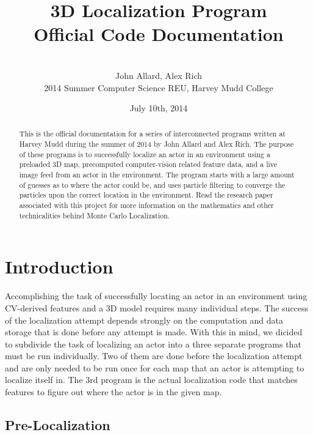 \documentclass[a4paper,11pt]{article}
\title{3D Localization Program \\ Official Code Documentation}
\author{ \\[7in]  John Allard, Alex Rich \\ 2014 Summer Computer Science REU, Harvey Mudd College}
\date{July 10th, 2014}
\begin{document}
  \maketitle
  \newpage

    \tableofcontents
    \newpage

    \begin{abstract}
    This is the official documentation for a series of interconnected programs written at Harvey Mudd during the summer of 2014 by John Allard and Alex Rich. The purpose of these programs is to successfully localize an actor in an environment using a preloaded 3D map, precomputed computer-vision related feature data, and a live image feed from an actor in the environment. The program starts with a large amount of guesses as to where the actor could be, and uses particle filtering to converge the particles upon the correct location in the environment. Read the research paper associated with this project for more information on the mathematics and other technicalities behind Monte Carlo Localization.
    \end{abstract}

    \section{Introduction}
    Accomplishing the task of successfully locating an actor in an environment using CV-derived features and a 3D model requires many individual steps. The success of the localization attempt depends strongly on the computation and data storage that is done before any attempt is made. With this in mind, we dicided to subdivide the task of localizing an actor into a three separate programs that must be run individually. Two of them are done before the localization attempt and are only needed to be run once for each map that an actor is attempting to localize itself in. The 3rd program is the actual localization code that matches features to figure out where the actor is in the given map.

    \subsection{Pre-Localization}
\end{document}
